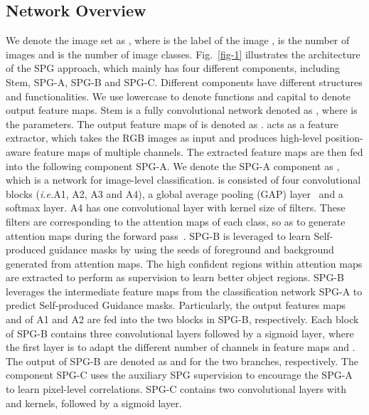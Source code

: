 \documentclass[runningheads]{llncs}
\newcommand{\ie}{\emph{i.e.}}
\begin{document}
\subsection{Network Overview}
We denote the image set as , where  is the label of the image ,  is the number of images and  is the number of image classes.
Fig.~\ref{fig-1} illustrates the architecture of the SPG approach, which mainly has four different components, including Stem, SPG-A, SPG-B and SPG-C.
Different components have different structures and functionalities.
We use lowercase  to denote functions and capital  to denote output feature maps.
Stem is a fully convolutional network denoted as , where  is the parameters. The output feature maps of  is denoted as .
 acts as a feature extractor, which takes the RGB images as input and produces high-level position-aware feature maps of multiple channels.
The extracted feature maps  are then fed into the following component SPG-A.
We denote the SPG-A component as , which is a network for image-level classification.
  is consisted of four convolutional blocks (\ie A1, A2, A3 and A4), a global average pooling (GAP) layer~\cite{lin2013network} and a softmax layer.
A4 has one convolutional layer with kernel size  of  filters.
These filters are corresponding to the attention maps of each class, so as to generate attention maps during the forward pass~\cite{zhang2018adversarial}.
SPG-B is leveraged to learn Self-produced guidance masks by using the seeds of foreground and background generated from attention maps.
The high confident regions within attention maps are extracted to perform as supervision to learn better object regions.
SPG-B leverages the intermediate feature maps from the classification network SPG-A to predict Self-produced Guidance masks.
Particularly, the output features maps  and  of A1 and A2 are fed into the two blocks in SPG-B, respectively.
Each block of SPG-B contains three convolutional layers followed by a sigmoid layer, where the first layer is to adapt the different number of channels in feature maps  and .
The output of SPG-B are denoted as  and  for the two branches, respectively.
The component SPG-C uses the auxiliary SPG supervision to encourage the SPG-A to learn pixel-level correlations.
SPG-C contains two convolutional layers with  and  kernels, followed by a sigmoid layer.
\end{document}
